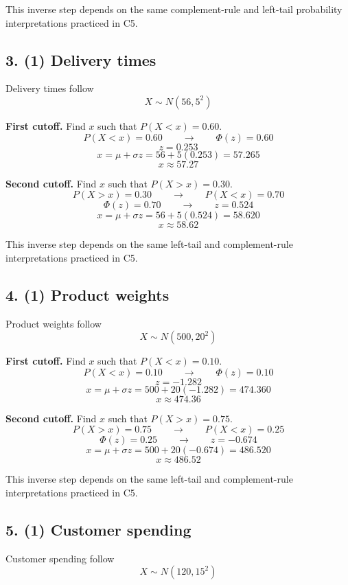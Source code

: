 	This inverse step depends on the same complement-rule and left-tail probability interpretations practiced in C5.
	
	
	\subsection*{3. (1) Delivery times}
	\label{subsec:inverse-normal-problems-c7-3}
	Delivery times follow
	\[
	X\sim N(56,5^2)
	\]
	
	\textbf{First cutoff.} Find \(x\) such that \(P(X<x)=0.60\).
	\[
	P(X<x)=0.60
	\qquad \longrightarrow \qquad
	\Phi(z)=0.60
	\]
	\[
	z=0.253
	\]
	\[
	x=\mu+\sigma z
	=56+5(0.253)
	=57.265
	\]
	\[
	x\approx 57.27
	\]
	
	\textbf{Second cutoff.} Find \(x\) such that \(P(X>x)=0.30\).
	\[
	P(X>x)=0.30
	\qquad \longrightarrow \qquad
	P(X<x)=0.70
	\]
	\[
	\Phi(z)=0.70
	\qquad \longrightarrow \qquad
	z=0.524
	\]
	\[
	x=\mu+\sigma z
	=56+5(0.524)
	=58.620
	\]
	\[
	x\approx 58.62
	\]
	
	This inverse step depends on the same left-tail and complement-rule interpretations practiced in C5.
	
	
	\subsection*{4. (1) Product weights}
	\label{subsec:inverse-normal-problems-c7-4}
	Product weights follow
	\[
	X\sim N(500,20^2)
	\]
	
	\textbf{First cutoff.} Find \(x\) such that \(P(X<x)=0.10\).
	\[
	P(X<x)=0.10
	\qquad \longrightarrow \qquad
	\Phi(z)=0.10
	\]
	\[
	z=-1.282
	\]
	\[
	x=\mu+\sigma z
	=500+20(-1.282)
	=474.360
	\]
	\[
	x\approx 474.36
	\]
	
	\textbf{Second cutoff.} Find \(x\) such that \(P(X>x)=0.75\).
	\[
	P(X>x)=0.75
	\qquad \longrightarrow \qquad
	P(X<x)=0.25
	\]
	\[
	\Phi(z)=0.25
	\qquad \longrightarrow \qquad
	z=-0.674
	\]
	\[
	x=\mu+\sigma z
	=500+20(-0.674)
	=486.520
	\]
	\[
	x\approx 486.52
	\]
	
	This inverse step depends on the same left-tail and complement-rule interpretations practiced in C5.
	
	
	\subsection*{5. (1) Customer spending}
	\label{subsec:inverse-normal-problems-c7-5}
	Customer spending follow
	\[
	X\sim N(120,15^2)
	\]
	
